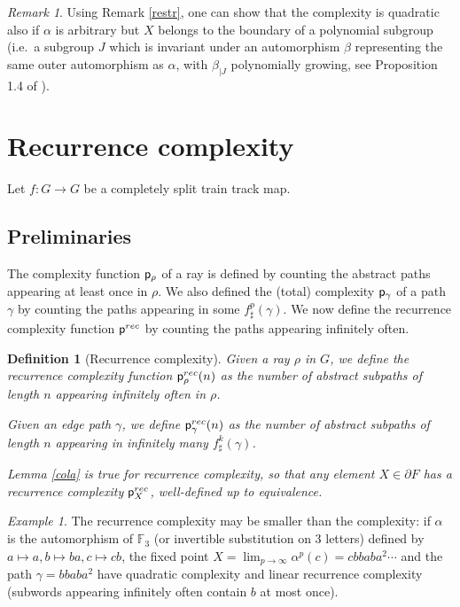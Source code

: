 \documentclass[11pt]{amsart}
\newtheorem{dfn}[thm]{Definition}
\theoremstyle{remark}
\newtheorem{rem}[thm]{Remark}
\newtheorem{example}[thm]{Example}
\newcommand{\pr}{\cp^{rec}}
\newcommand{\cp}{{\sf  p}}
\newcommand {\F} {{\mathbb {F}}}
\newcommand{\bo}{\partial}
\begin{document}
\begin{rem}

Using  Remark \ref{restr}, one can show that the complexity is quadratic also if $\alpha$ is arbitrary but $X$ belongs to the boundary of a polynomial subgroup (i.e.\ a subgroup $J$ which is invariant under an automorphism $\beta$ representing the same outer automorphism as $\alpha$, 
with $\beta_{ | J}$  polynomially growing, see Proposition 1.4 of \cite{counting}).
\end{rem}


\section{Recurrence complexity} \label{reccom}

Let $f:G\to G$ be a completely split train track map.
 
 \subsection{Preliminaries}
The complexity function $\cp_\rho$ of a ray is defined by counting the abstract paths appearing at least once in $\rho$. We also defined the (total) complexity $\cp_\gamma$ of a path $\gamma$ by counting the   paths appearing in some $f^p_\sharp(\gamma)$.
We now define the recurrence complexity function $\pr$ by counting the paths appearing infinitely often.

\begin{dfn}[Recurrence complexity]
Given a ray $\rho$ in $G$, we define the recurrence complexity function $\pr_\rho(n)$ as the   number of abstract subpaths of length $n$ appearing infinitely often in $\rho$.

Given an edge path $\gamma$, we define $\pr_\gamma(n)$ as the   number of abstract subpaths of length $n$ appearing in infinitely many $f^k_\sharp(\gamma)$.



  Lemma \ref{cola} is true for recurrence complexity, so that any element $X\in\bo F$ has a recurrence complexity $\pr_X$, well-defined up to equivalence.

\end{dfn}

\begin{example}\label{rcdif}
The recurrence complexity may be smaller than the complexity: if
  $\alpha$ is the automorphism of $\F_3$ (or invertible substitution on 3 letters) defined by $a\mapsto a,b\mapsto  ba,c\mapsto  cb$, the fixed point $X=\lim_{p\to\infty}\alpha^p(c)=cbbaba^2\cdots$ and the path $\gamma=bbaba^2$ have quadratic complexity and linear recurrence complexity    (subwords appearing infinitely often contain $b$ at most once).
\end{example}
\end{document}
